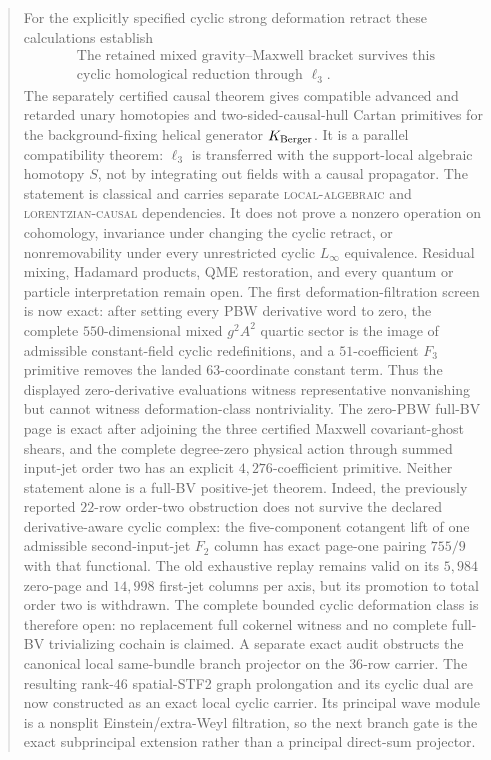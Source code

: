 \documentclass[11pt]{article}
\theoremstyle{definition}
\theoremstyle{remark}
\begin{document}
\begin{abstract}
For the explicitly specified cyclic strong deformation retract these
calculations establish
\[
 \boxed{\begin{gathered}
 \text{The retained mixed gravity--Maxwell bracket survives this}\\
 \text{cyclic homological reduction through }\ell_3.
 \end{gathered}}
\]
The separately certified causal theorem gives compatible advanced and
retarded unary homotopies and two-sided-causal-hull Cartan primitives for the
background-fixing helical generator $K_{\rm Berger}$.  It is a parallel
compatibility theorem: $\ell_3$ is transferred with the support-local
algebraic homotopy $S$, not by integrating out fields with a causal
propagator.  The statement is classical and carries separate
\textsc{local-algebraic} and \textsc{lorentzian-causal} dependencies.  It
does not prove a nonzero operation on cohomology, invariance under changing
the cyclic retract, or nonremovability under every unrestricted cyclic
$L_\infty$ equivalence.  Residual mixing,
Hadamard products, QME restoration, and every quantum or particle
interpretation remain open.  The first deformation-filtration screen is now
exact: after setting every PBW derivative word to zero, the complete
$550$-dimensional mixed $g^2A^2$ quartic sector is the image of admissible
constant-field cyclic redefinitions, and a $51$-coefficient $F_3$ primitive
removes the landed $63$-coordinate constant term.  Thus the displayed
zero-derivative evaluations witness representative nonvanishing but cannot
witness deformation-class nontriviality.  The zero-PBW full-BV page is exact
after adjoining the three certified Maxwell covariant-ghost shears, and the
complete degree-zero physical action through summed input-jet order two has
an explicit $4{,}276$-coefficient primitive.  Neither statement alone is a
full-BV positive-jet theorem.  Indeed, the previously reported $22$-row
order-two obstruction does not survive the declared derivative-aware cyclic
complex: the five-component cotangent lift of one admissible second-input-jet
$F_2$ column has exact page-one pairing $755/9$ with that functional.  The old
exhaustive replay remains valid on its $5{,}984$ zero-page and $14{,}998$
first-jet columns per axis, but its promotion to total order two is withdrawn.
The complete bounded cyclic deformation class is therefore open: no
replacement full cokernel witness and no complete full-BV trivializing
cochain is claimed.
A separate exact audit obstructs the canonical
local same-bundle branch projector on the $36$-row carrier.  The resulting
rank-$46$ spatial-STF2 graph prolongation and its cyclic dual are now
constructed as an exact local cyclic carrier.  Its principal wave module is
a nonsplit Einstein/extra-Weyl filtration, so the next branch gate is the
exact subprincipal extension rather than a principal direct-sum projector.
\end{abstract}
\end{document}
